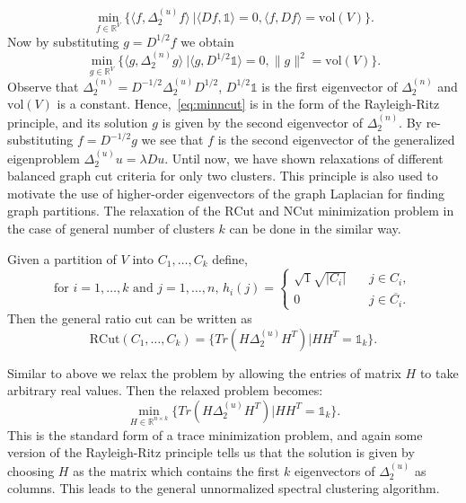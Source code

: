 \begin{equation}
\min \limits_{f \in \mathbb{R}^V} \{\langle f, \Delta_{2}^{(u)} f \rangle\ | \langle Df, \mathds{1} \rangle=0, \langle f, Df \rangle = \mathrm{vol}(V)\}.
\end{equation}
Now by substituting $g = D^{1/2}f$ we obtain
\begin{equation}
\label{eq:minncut}
\min \limits_{g \in \mathbb{R}^V} \{\langle g, \Delta_{2}^{(n)} g \rangle\ |\langle g, D^{1/2}\mathds{1} \rangle=0, \lVert g \rVert^2 = \mathrm{vol}(V)\}.
\end{equation}
Observe that $\Delta_{2}^{(n)} = D^{-1/2} \Delta_{2}^{(u)} D^{1/2}$, $D^{1/2}\mathds{1}$ is the first eigenvector of $\Delta_{2}^{(n)}$ and $\mathrm{vol}(V)$ is a constant. 
Hence,~\eqref{eq:minncut} is in the form of the Rayleigh-Ritz principle,
and its solution $g$ is given by the second eigenvector of $\Delta_{2}^{(n)}$. By re-substituting $f = D^{-1/2}g$ we see that $f$ is the second eigenvector of the generalized eigenproblem $\Delta_{2}^{(u)}u= \lambda Du$.  
Until now, we have shown relaxations of different balanced graph cut criteria for only two clusters. This principle is also used to motivate the use of higher-order eigenvectors of the graph 
Laplacian for finding graph partitions.
The relaxation of the $\mathrm{RCut}$ and $\mathrm{NCut}$ minimization problem in the case of general number of clusters $k$ can be done in the similar way.
\begin{lemma}
\label{lem:multircut}
Given a partition of $V$ into $C_1,\dots,C_k$ define,
\begin{equation}
\label{eq:fmultircut}
\text{for $i = 1,\dots,k$ and $j=1,\dots,n$, }
 h_i(j) = \begin{cases} 
                      \sqrt{1}{\sqrt{\rvert C_i\lvert}}   & \quad j \in C_i, \\
                      0 & \quad j \in \overline{C_i}.
                     \end{cases}
\end{equation}
Then the general ratio cut can be written as
\begin{equation*}
\mathrm{RCut}(C_1,\dots,C_k) = \{Tr(H\Delta_{2}^{(u)}H^T) |HH^T = \mathds{1}_k\}.
\end{equation*}
\end{lemma}
Similar to above we relax the problem by allowing the entries of matrix $H$ to take arbitrary real values. Then the relaxed problem becomes:
\begin{equation}
\min\limits_{H \in \mathbb{R}^{n\times k}} \{Tr(H\Delta_{2}^{(u)}H^T) |HH^T = \mathds{1}_k\}.
\end{equation}
This is the standard form of a trace minimization problem, and again some version of the Rayleigh-Ritz principle tells us that the solution is given by choosing $H$ as the matrix which contains the first $k$ eigenvectors of 
$\Delta_{2}^{(u)}$ as columns. This leads to the general unnormalized spectral clustering algorithm.

